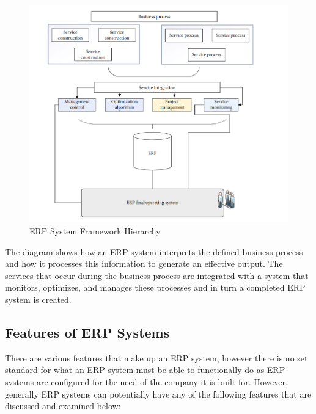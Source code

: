 \linebreak
\begin{figure}[ht!]
    \centering
    \includegraphics[width=1\linewidth]{img/ERP system framework hierachy.png}
    \caption{ERP System Framework Hierarchy}
    \label{fig:enter-label}
\end{figure}
\par{The diagram shows how an ERP system interprets the defined business process and how it processes this information to generate an effective output. The services that occur during the business process are integrated with a system that monitors, optimizes, and manages these processes and in turn a completed ERP system is created. }
\subsection{Features of ERP Systems}
\par{There are various features that make up an ERP system, however there is no set standard for what an ERP system must be able to functionally do as ERP systems are configured for the need of the company it is built for. However, generally ERP systems can potentially have any of the following features that are discussed and examined below:}
